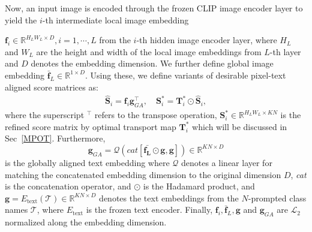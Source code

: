 \documentclass[nohyperref]{article}
\newcommand{\bs}{\boldsymbol}
\theoremstyle{plain}
\theoremstyle{definition}
\theoremstyle{remark}
\begin{document}
Now,  an input image is encoded through the frozen CLIP image encoder layer to yield  the $i$-th intermediate local image embedding {$\bs{f}_i \in \mathbb{R}^{H_LW_L \times D}, i=1,\cdots, L$  from the $i$-th hidden image encoder layer, where $H_{L}$ and $W_{L}$ are the height and width of the local image embeddings from $L$-th layer and $D$ denotes the embedding dimension. 
We further define global image embedding $\bs{\bar{f}}_L \in \mathbb{R}^{1 \times D}$.
Using these, we define variants of desirable pixel-text aligned score matrices as: 
\begin{align}
	\bs{\hat S}_i = \bs{f}_i {\bs{g}^{\top}_{GA}},\quad  \bs{S}^{\ast}_i= \bs{T}^{\ast}_i \odot\bs{\hat S}_i,
	\label{eq:score}
\end{align} 
where the superscript $^{\top}$ refers to the transpose operation, 
$\bs{S}^{\ast}_i \in \mathbb{R}^{H_LW_L \times KN}$ is the refined score matrix by optimal transport map $\bs{T}^{\ast}_i$ which will be discussed in Sec~\ref{MPOT}. 
Furthermore, 
$$ \bs{g}_{GA} = \mathcal{Q} (cat\left[\bs{\bar{f_L}}  \odot \bs{{g}}, \bs{{g}} \right] )  \in \mathbb{R}^{KN \times D}$$
 is the globally aligned text embedding where $\mathcal{Q}$ denotes a linear layer for matching the concatenated embedding dimension to the original dimension $D$,   \textit{cat} is the concatenation operator,  and $\odot$ is the Hadamard product,
and  $\bs{g} = E_{\text{text}}(\mathcal{T}) \in {\mathbb{R}^{KN \times D}}$ denotes the 
text embeddings from the $N$-prompted class names $\mathcal{T}$, where $E_{\text{text}}$ is the frozen text encoder.
% 
%
Finally, $\bs{f}_i,\bs{\bar{f}}_L,\bs{g}$ and $\bs{g}_{GA}$ are $\mathcal{L}_2$ normalized along the embedding dimension. 

}
\end{document}
